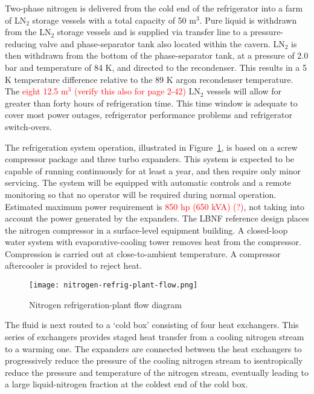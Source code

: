 Two-phase nitrogen is delivered from the cold end of the refrigerator 
into a farm of  LN$_2$ storage vessels with a total capacity of 50 m$^3$. 
Pure liquid is withdrawn from the LN$_2$ storage vessels and is supplied 
via transfer line to a pressure-reducing valve and phase-separator tank 
also located within the cavern. LN$_2$ is then withdrawn from the bottom 
of the phase-separator tank, at a pressure of 2.0 bar and temperature of 
84 K, and directed to the recondenser. This results in a 5 K temperature 
difference relative to the 89 K argon recondenser temperature. The 
\textcolor{red}{eight 12.5 m$^3$ (verify this also for page 2-42)} LN$_2$ 
vessels will allow for greater than forty hours of refrigeration time.
This time window is adequate to cover most power outages, refrigerator 
performance problems and refrigerator switch-overs.



The refrigeration system operation, illustrated in Figure~\ref{fig:LN2-refrigerator-flow}, 
is based on a screw compressor package and three turbo expanders. 
This system is expected to be capable of running  
continuously for at least a year, and then require only 
minor servicing. The system will be equipped with 
automatic controls and a remote monitoring so that no operator 
will be required during normal operation. 
Estimated maximum power requirement is \textcolor{red}{850 hp (650 kVA) (?)}, 
not taking into account the power generated by the expanders.  
The LBNF reference design places the nitrogen compressor in 
a surface-level equipment building. A closed-loop water system 
with evaporative-cooling tower removes heat from the compressor. 
Compression is carried out at close-to-ambient temperature. 
A compressor aftercooler is provided to reject heat. 

\begin{figure}[htbp]
\centering
\texttt{[image: nitrogen-refrig-plant-flow.png]}
\caption{Nitrogen refrigeration-plant flow diagram}
\label{fig:LN2-refrigerator-flow}
\end{figure}

The fluid is next routed to a `cold box' consisting of four heat exchangers.  
This series of exchangers provides staged heat transfer from a cooling 
nitrogen stream to a warming one.  The expanders are connected between 
the heat exchangers to progressively reduce the pressure of the cooling 
nitrogen stream to isentropically reduce the pressure and temperature of the
nitrogen stream, eventually leading to a large liquid-nitrogen fraction 
at the coldest end of the cold box. 


